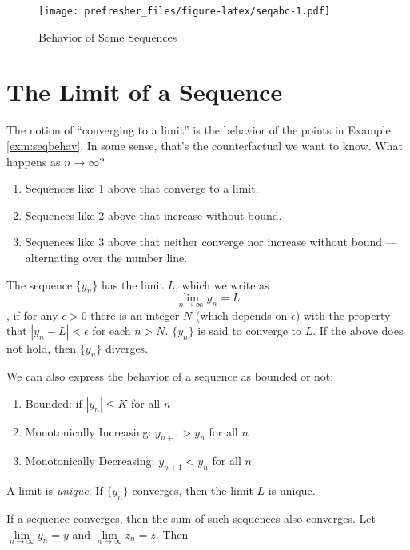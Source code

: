 \documentclass[]{book}
\providecommand{\tightlist}{%
  \setlength{\itemsep}{0pt}\setlength{\parskip}{0pt}}
\theoremstyle{definition}
\theoremstyle{definition}
\theoremstyle{definition}
\theoremstyle{remark}
\let\BeginKnitrBlock\begin \let\EndKnitrBlock\end
\begin{document}
\begin{figure}
\centering
\texttt{[image: prefresher\_files/figure-latex/seqabc-1.pdf]}
\caption{\label{fig:seqabc}Behavior of Some Sequences}
\end{figure}

\section{The Limit of a Sequence}\label{the-limit-of-a-sequence}

The notion of ``converging to a limit'' is the behavior of the points in
Example \ref{exm:seqbehav}. In some sense, that's the counterfactual we
want to know. What happens as \(n\rightarrow \infty\)?

\begin{enumerate}
\def\labelenumi{\arabic{enumi}.}
\tightlist
\item
  Sequences like 1 above that converge to a limit.
\item
  Sequences like 2 above that increase without bound.
\item
  Sequences like 3 above that neither converge nor increase without
  bound --- alternating over the number line.
\end{enumerate}

\BeginKnitrBlock{definition}
\protect\hypertarget{def:unnamed-chunk-2}{}{\label{def:unnamed-chunk-2} }The
sequence \(\{y_n\}\) has the limit \(L\), which we write as
\[\lim\limits_{n \to \infty} y_n =L\], if for any \(\epsilon>0\) there
is an integer \(N\) (which depends on \(\epsilon\)) with the property
that \(|y_n -L|<\epsilon\) for each \(n>N\). \(\{y_n\}\) is said to
converge to \(L\). If the above does not hold, then \(\{y_n\}\)
diverges.
\EndKnitrBlock{definition}

We can also express the behavior of a sequence as bounded or not:

\begin{enumerate}
\def\labelenumi{\arabic{enumi}.}
\tightlist
\item
  Bounded: if \(|y_n|\le K\) for all \(n\)
\item
  Monotonically Increasing: \(y_{n+1}>y_n\) for all \(n\)
\item
  Monotonically Decreasing: \(y_{n+1}<y_n\) for all \(n\)
\end{enumerate}

A limit is \emph{unique}: If \(\{y_n\}\) converges, then the limit \(L\)
is unique.

If a sequence converges, then the sum of such sequences also converges.
Let \(\lim\limits_{n \to \infty} y_n = y\) and
\(\lim\limits_{n \to \infty} z_n =z\). Then
\end{document}
